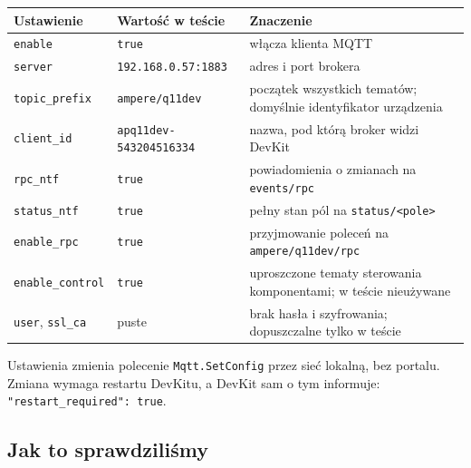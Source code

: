 \documentclass[11pt,a4paper]{article}
\begin{document}
\begin{longtable}{>{\raggedright\arraybackslash}p{3.00cm}>{\raggedright\arraybackslash}p{2.72cm}>{\raggedright\arraybackslash}p{9.56cm}}
\toprule
\rowcolor{apteallight}\textbf{Ustawienie} & \textbf{Wartość w teście} & \textbf{Znaczenie} \\
\midrule\endhead
\bottomrule\endfoot
\texttt{enable} & \texttt{true} & włącza klienta MQTT \\
\texttt{server} & \texttt{192.\allowbreak{}168.\allowbreak{}0.\allowbreak{}57:\allowbreak{}1883} & adres i port brokera \\
\texttt{topic\_prefix} & \texttt{ampere/\allowbreak{}q11dev} & początek wszystkich tematów; domyślnie identyfikator urządzenia \\
\texttt{client\_id} & \texttt{apq11dev-\allowbreak{}543204516334} & nazwa, pod którą broker widzi DevKit \\
\texttt{rpc\_ntf} & \texttt{true} & powiadomienia o zmianach na \texttt{events/rpc} \\
\texttt{status\_ntf} & \texttt{true} & pełny stan pól na \texttt{status/\allowbreak{}<pole>} \\
\texttt{enable\_rpc} & \texttt{true} & przyjmowanie poleceń na \texttt{ampere/\allowbreak{}q11dev/\allowbreak{}rpc} \\
\texttt{enable\_\allowbreak{}control} & \texttt{true} & uproszczone tematy sterowania komponentami; w teście nieużywane \\
\texttt{user}, \texttt{ssl\_ca} & puste & brak hasła i szyfrowania; dopuszczalne tylko w teście \\
\end{longtable}

Ustawienia zmienia polecenie \texttt{Mqtt.\allowbreak{}SetConfig} przez sieć lokalną, bez portalu. Zmiana wymaga restartu DevKitu, a DevKit sam o tym informuje: \texttt{"restart\_\allowbreak{}required":\allowbreak{} true}.


\subsection{Jak to sprawdziliśmy}
\end{document}
